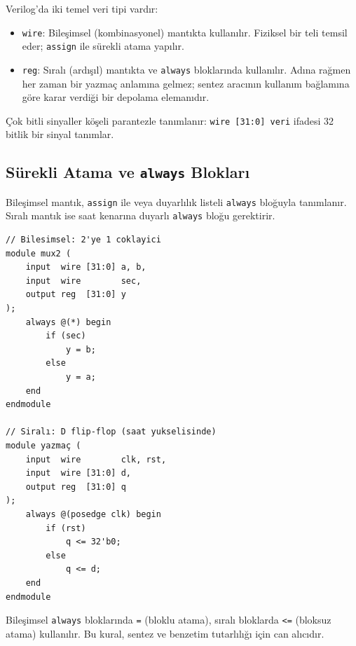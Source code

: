 Verilog'da iki temel veri tipi vardır:

\begin{itemize}[leftmargin=2em]
    \item \texttt{wire}: Bileşimsel (kombinasyonel) mantıkta kullanılır. Fiziksel bir teli temsil eder; \texttt{assign} ile sürekli atama yapılır.
    \item \texttt{reg}: Sıralı (ardışıl) mantıkta ve \texttt{always} bloklarında kullanılır. Adına rağmen her zaman bir yazmaç anlamına gelmez; sentez aracının kullanım bağlamına göre karar verdiği bir depolama elemanıdır.
\end{itemize}

Çok bitli sinyaller köşeli parantezle tanımlanır: \texttt{wire [31:0] veri} ifadesi 32 bitlik bir sinyal tanımlar.

\subsection{Sürekli Atama ve \texttt{always} Blokları}
\label{sec:ekd-always}

Bileşimsel mantık, \texttt{assign} ile veya duyarlılık listeli \texttt{always} bloğuyla tanımlanır. Sıralı mantık ise saat kenarına duyarlı \texttt{always} bloğu gerektirir.

\begin{lstlisting}[style=verilog, caption={Bileşimsel ve sıralı mantık örnekleri}, label={lst:ekd-always}]
// Bilesimsel: 2'ye 1 coklayici
module mux2 (
    input  wire [31:0] a, b,
    input  wire        sec,
    output reg  [31:0] y
);
    always @(*) begin
        if (sec)
            y = b;
        else
            y = a;
    end
endmodule

// Siralı: D flip-flop (saat yukselisinde)
module yazmaç (
    input  wire        clk, rst,
    input  wire [31:0] d,
    output reg  [31:0] q
);
    always @(posedge clk) begin
        if (rst)
            q <= 32'b0;
        else
            q <= d;
    end
endmodule
\end{lstlisting}

\begin{bilginot}
Bileşimsel \texttt{always} bloklarında \texttt{=} (bloklu atama), sıralı bloklarda \texttt{<=} (bloksuz atama) kullanılır. Bu kural, sentez ve benzetim tutarlılığı için can alıcıdır.
\end{bilginot}


